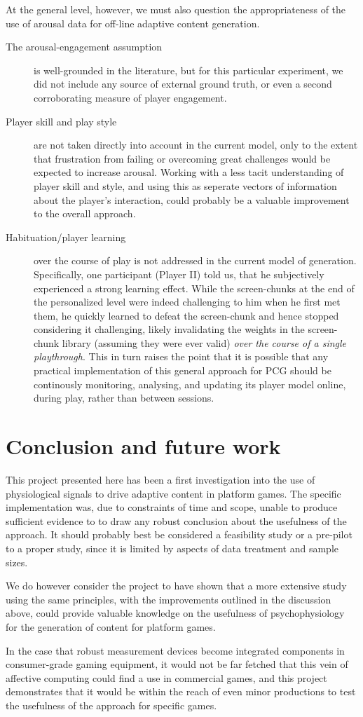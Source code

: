 \documentclass{llncs}
\begin{document}
At the general level, however, we must also question the appropriateness of the use of arousal data for off-line adaptive content generation.
\begin{description}
\item [The arousal-engagement assumption] is well-grounded in the literature, but for this particular experiment, we did not include any source of external ground truth, or even a second corroborating measure of player engagement.
\item [Player skill and play style] are not taken directly into account in the current model, only to the extent that frustration from failing or overcoming great challenges would be expected to increase arousal. Working with a less tacit understanding of player skill and style, and using this as seperate vectors of information about the player's interaction, could probably be a valuable improvement to the overall approach.
\item [Habituation/player learning] over the course of play is not addressed in the current model of generation. Specifically, one participant (Player II) told us, that he subjectively experienced a strong learning effect. While the screen-chunks at the end of the personalized level were indeed challenging to him when he first met them, he quickly learned to defeat the screen-chunk and hence stopped considering it challenging, likely invalidating the weights in the screen-chunk library (assuming they were ever valid) \emph{over the course of a single playthrough}. This in turn raises the point that it is possible that any practical implementation of this general approach for PCG should be continously monitoring, analysing, and updating its player model online, during play, rather than between sessions.
\end{description}

\section{Conclusion and future work}
This project presented here has been a first investigation into the use of physiological signals to drive adaptive content in platform games. The specific implementation was, due to constraints of time and scope, unable to produce sufficient evidence to to draw any robust conclusion about the usefulness of the approach. It should probably best be considered a feasibility study or a pre-pilot to a proper study, since it is limited by aspects of data treatment and sample sizes.

We do however consider the project to have shown that a more extensive study using the same principles, with the improvements outlined in the discussion above, could provide valuable knowledge on the usefulness of psychophysiology for the generation of content for platform games.

In the case that robust measurement devices become integrated components in consumer-grade gaming equipment, it would not be far fetched that this vein of affective computing could find a use in commercial games, and this project demonstrates that it would be within the reach of even minor productions to test the usefulness of the approach for specific games.


\end{document}
